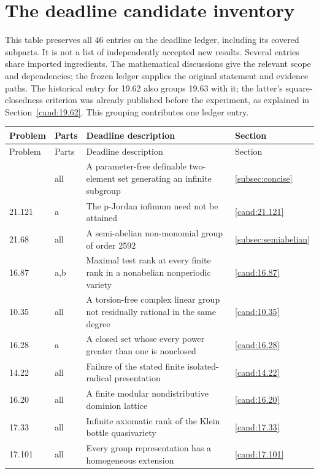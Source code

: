 \section{The deadline candidate inventory}
\label{app:inventory}
This table preserves all 46 entries on the deadline ledger, including its
covered subparts. It is not a list of independently accepted new results.
Several entries share imported ingredients. The mathematical discussions
give the relevant scope and dependencies; the frozen ledger supplies the
original statement and evidence paths. The historical entry for 19.62
also groups 19.63 with it; the latter's square-closedness criterion was
already published before the experiment, as explained in
Section~\ref{cand:19.62}. This grouping contributes one ledger entry.

\small
\begin{longtable}{@{}p{}p{}>{\raggedright\arraybackslash}p{}p{}@{}}
\toprule
Problem & Parts & Deadline description & Section\\
\midrule
\endfirsthead
\toprule
Problem & Parts & Deadline description & Section\\
\midrule
\endhead
\bottomrule
\endfoot
21.106 & all & A parameter-free definable two-element set generating an infinite subgroup & \ref{subsec:concise} \\
21.121 & a & The p-Jordan infimum need not be attained & \ref{cand:21.121} \\
21.68 & all & A semi-abelian non-monomial group of order 2592 & \ref{subsec:semiabelian} \\
16.87 & a,b & Maximal test rank at every finite rank in a nonabelian nonperiodic variety & \ref{cand:16.87} \\
10.35 & all & A torsion-free complex linear group not residually rational in the same degree & \ref{cand:10.35} \\
16.28 & a & A closed set whose every power greater than one is nonclosed & \ref{cand:16.28} \\
14.22 & all & Failure of the stated finite isolated-radical presentation & \ref{cand:14.22} \\
16.20 & all & A finite modular nondistributive dominion lattice & \ref{cand:16.20} \\
17.33 & all & Infinite axiomatic rank of the Klein bottle quasivariety & \ref{cand:17.33} \\
17.101 & all & Every group representation has a homogeneous extension & \ref{cand:17.101} \\

\end{longtable}
